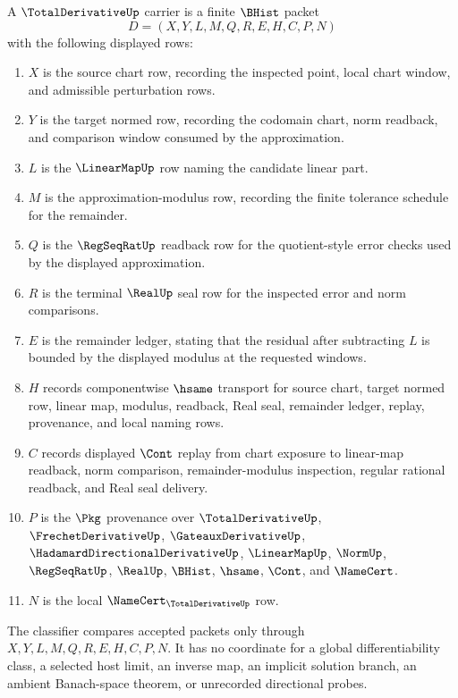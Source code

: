 \begin{definition}
\label{def:total-derivative-carrier}
A $\TotalDerivativeUp$ carrier is a finite $\BHist$ packet
$$
D=(X,Y,L,M,Q,R,E,H,C,P,N)
$$
with the following displayed rows:
\begin{enumerate}
\item $X$ is the source chart row, recording the inspected point, local chart window, and admissible perturbation rows.
\item $Y$ is the target normed row, recording the codomain chart, norm readback, and comparison window consumed by the approximation.
\item $L$ is the $\LinearMapUp$ row naming the candidate linear part.
\item $M$ is the approximation-modulus row, recording the finite tolerance schedule for the remainder.
\item $Q$ is the $\RegSeqRatUp$ readback row for the quotient-style error checks used by the displayed approximation.
\item $R$ is the terminal $\RealUp$ seal row for the inspected error and norm comparisons.
\item $E$ is the remainder ledger, stating that the residual after subtracting $L$ is bounded by the displayed modulus at the requested windows.
\item $H$ records componentwise $\hsame$ transport for source chart, target normed row, linear map, modulus, readback, Real seal, remainder ledger, replay, provenance, and local naming rows.
\item $C$ records displayed $\Cont$ replay from chart exposure to linear-map readback, norm comparison, remainder-modulus inspection, regular rational readback, and Real seal delivery.
\item $P$ is the $\Pkg$ provenance over $\TotalDerivativeUp$, $\FrechetDerivativeUp$, $\GateauxDerivativeUp$, $\HadamardDirectionalDerivativeUp$, $\LinearMapUp$, $\NormUp$, $\RegSeqRatUp$, $\RealUp$, $\BHist$, $\hsame$, $\Cont$, and $\NameCert$.
\item $N$ is the local $\NameCert_{\TotalDerivativeUp}$ row.
\end{enumerate}
The classifier compares accepted packets only through $X,Y,L,M,Q,R,E,H,C,P,N$. It has no coordinate for a global differentiability class, a selected host limit, an inverse map, an implicit solution branch, an ambient Banach-space theorem, or unrecorded directional probes.
\end{definition}

